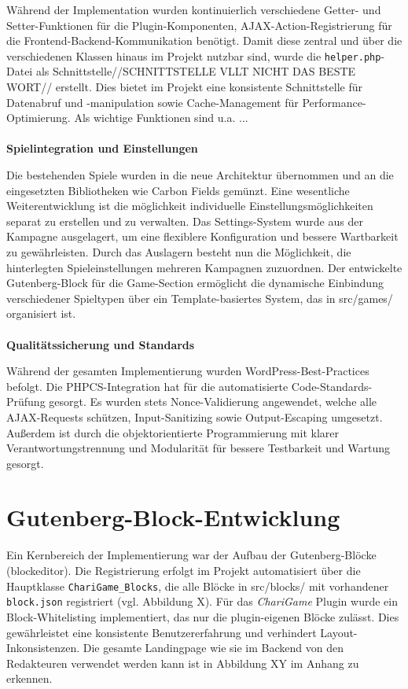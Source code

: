 Während der Implementation wurden kontinuierlich verschiedene Getter- und Setter-Funktionen für die Plugin-Komponenten, AJAX-Action-Registrierung für die Frontend-Backend-Kommunikation benötigt.
Damit diese zentral und über die verschiedenen Klassen hinaus im Projekt nutzbar sind, wurde die \texttt{helper.php}-Datei als Schnittstelle//SCHNITTSTELLE VLLT NICHT DAS BESTE WORT// erstellt.
Dies bietet im Projekt eine konsistente Schnittstelle für Datenabruf und -manipulation sowie Cache-Management für Performance-Optimierung.
Als wichtige Funktionen sind u.a. ...
\\\\
\textbf{Spielintegration und Einstellungen}

Die bestehenden Spiele wurden in die neue Architektur übernommen und an die eingesetzten Bibliotheken wie Carbon Fields gemünzt.
Eine wesentliche Weiterentwicklung ist die möglichkeit individuelle Einstellungsmöglichkeiten separat zu erstellen und zu verwalten.
Das Settings-System wurde aus der Kampagne ausgelagert, um eine flexiblere Konfiguration und bessere Wartbarkeit zu gewährleisten.
Durch das Auslagern besteht nun die Möglichkeit, die hinterlegten Spieleinstellungen mehreren Kampagnen zuzuordnen.
Der entwickelte Gutenberg-Block für die Game-Section ermöglicht die dynamische Einbindung verschiedener Spieltypen über ein Template-basiertes System, das in src/games/ organisiert ist.
\\\\
\textbf{Qualitätssicherung und Standards}

Während der gesamten Implementierung wurden WordPress-Best-Practices befolgt.
Die PHPCS-Integration hat für die automatisierte Code-Standards-Prüfung gesorgt.
Es wurden stets Nonce-Validierung angewendet, welche alle AJAX-Requests schützen, Input-Sanitizing sowie Output-Escaping umgesetzt.
Außerdem ist durch die objektorientierte Programmierung mit klarer Verantwortungstrennung und Modularität für bessere Testbarkeit und Wartung gesorgt.

\section{Gutenberg-Block-Entwicklung}

Ein Kernbereich der Implementierung war der Aufbau der Gutenberg-Blöcke (\gls{blockeditor}).
Die Registrierung erfolgt im Projekt automatisiert über die Hauptklasse \texttt{ChariGame\_Blocks}, die alle Blöcke in src/blocks/ mit vorhandener \texttt{block.json} registriert (vgl. Abbildung X). %
Für das \textit{ChariGame} Plugin wurde ein Block-Whitelisting implementiert, das nur die plugin-eigenen Blöcke zulässt.
Dies gewährleistet eine konsistente Benutzererfahrung und verhindert Layout-Inkonsistenzen.
Die gesamte Landingpage wie sie im Backend von den Redakteuren verwendet werden kann ist in Abbildung XY im Anhang zu erkennen. %

